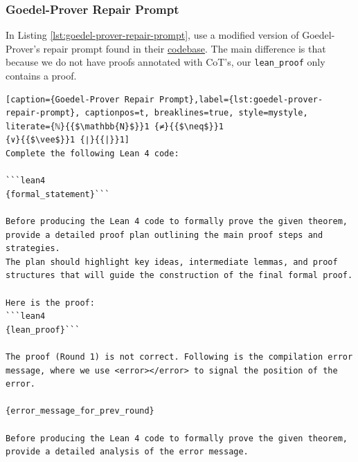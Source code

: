 \subsubsection{Goedel-Prover Repair Prompt}

In Listing \ref{lst:goedel-prover-repair-prompt}, use a modified version of Goedel-Prover's repair prompt found in their \href{https://github.com/Goedel-LM/Goedel-Prover-V2}{codebase}. 
The main difference is that because we do not have proofs annotated with CoT's, our \texttt{lean\_proof} only contains a proof. 

\begin{lstlisting}[caption={Goedel-Prover Repair Prompt},label={lst:goedel-prover-repair-prompt}, captionpos=t, breaklines=true, style=mystyle, literate={ℕ}{{$\mathbb{N}$}}1 {≠}{{$\neq$}}1
{∨}{{$\vee$}}1 {∣}{{|}}1]
Complete the following Lean 4 code:

```lean4
{formal_statement}```

Before producing the Lean 4 code to formally prove the given theorem, provide a detailed proof plan outlining the main proof steps and strategies.
The plan should highlight key ideas, intermediate lemmas, and proof structures that will guide the construction of the final formal proof.

Here is the proof:
```lean4
{lean_proof}```

The proof (Round 1) is not correct. Following is the compilation error message, where we use <error></error> to signal the position of the error.

{error_message_for_prev_round}

Before producing the Lean 4 code to formally prove the given theorem, provide a detailed analysis of the error message.
\end{lstlisting}

\newpage
